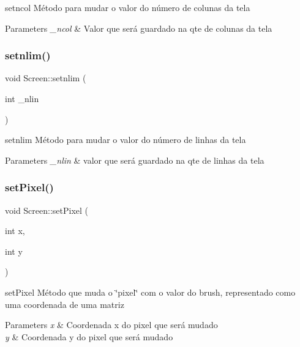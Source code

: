 setncol Método para mudar o valor do número de colunas da tela 


\begin{DoxyParams}{Parameters}
{\em \+\_\+ncol} & Valor que será guardado na qte de colunas da tela \\
\hline
\end{DoxyParams}
\mbox{\label{class_screen_ac4d187efda643cfc9127230d6363c721}} 
\subsubsection{\texorpdfstring{setnlim()}{setnlim()}}
{\footnotesize\ttfamily void Screen\+::setnlim (\begin{DoxyParamCaption}\item[{int}]{\+\_\+nlin }\end{DoxyParamCaption})}



setnlim Método para mudar o valor do número de linhas da tela 


\begin{DoxyParams}{Parameters}
{\em \+\_\+nlin} & valor que será guardado na qte de linhas da tela \\
\hline
\end{DoxyParams}
\mbox{\label{class_screen_ae6bea81c57a22d226507c3c26fa95ee0}} 
\subsubsection{\texorpdfstring{set\+Pixel()}{setPixel()}}
{\footnotesize\ttfamily void Screen\+::set\+Pixel (\begin{DoxyParamCaption}\item[{int}]{x,  }\item[{int}]{y }\end{DoxyParamCaption})}



set\+Pixel Método que muda o \char`\"{}pixel\char`\"{} com o valor do \textquotesingle{}brush\textquotesingle{}, representado como uma coordenada de uma matriz 


\begin{DoxyParams}{Parameters}
{\em x} & Coordenada x do pixel que será mudado \\
\hline
{\em y} & Coordenada y do pixel que será mudado \\
\hline
\end{DoxyParams}



